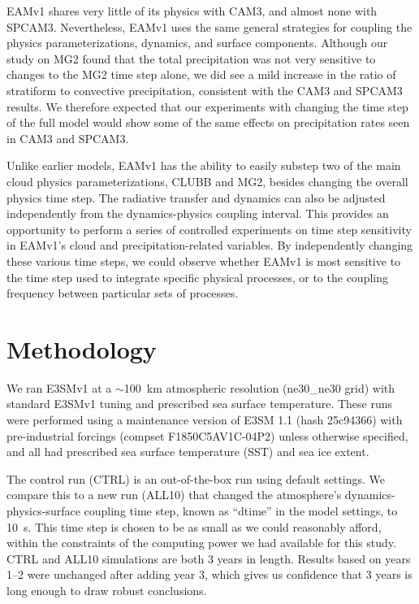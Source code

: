 \documentclass [11pt, proquest] {uwthesis}[2020/02/24]
\begin{document}
EAMv1 shares very little of its physics with CAM3, and almost none with SPCAM3. Nevertheless, EAMv1 uses the same general strategies for coupling the physics parameterizations, dynamics, and surface components. Although our study on MG2 found that the total precipitation was not very sensitive to changes to the MG2 time step alone, we did see a mild increase in the ratio of stratiform to convective precipitation, consistent with the CAM3 and SPCAM3 results. We therefore expected that our experiments with changing the time step of the full model would show some of the same effects on precipitation rates seen in CAM3 and SPCAM3.

Unlike earlier models, EAMv1 has the ability to easily substep two of the main cloud physics parameterizations, CLUBB and MG2, besides changing the overall physics time step. The radiative transfer and dynamics can also be adjusted independently from the dynamics-physics coupling interval. This provides an opportunity to perform a series of controlled experiments on time step sensitivity in EAMv1's cloud and precipitation-related variables. By independently changing these various time steps, we could observe whether EAMv1 is most sensitive to the time step used to integrate specific physical processes, or to the coupling frequency between particular sets of processes.

\section{Methodology} \label{sec:EAM-methodology}

We ran E3SMv1 at a $\sim$\SI{100}{\kilo\meter} atmospheric resolution (ne30\_ne30 grid) with standard E3SMv1 tuning and prescribed sea surface temperature. These runs were performed using a maintenance version of E3SM 1.1 (hash 25c94366) with pre-industrial forcings (compset F1850C5AV1C-04P2) unless otherwise specified, and all had prescribed sea surface temperature (SST) and sea ice extent.

The control run (CTRL) is an out-of-the-box run using default settings. We compare this to a new run (ALL10) that changed the atmosphere's dynamics-physics-surface coupling time step, known as ``dtime'' in the model settings, to \SI{10}{\second}. This time step is chosen to be as small as we could reasonably afford, within the constraints of the computing power we had available for this study. CTRL and ALL10 simulations are both \num{3} years in length. Results based on years \numrange{1}{2} were unchanged after adding year \num{3}, which gives us confidence that \num{3} years is long enough to draw robust conclusions.
\end{document}
